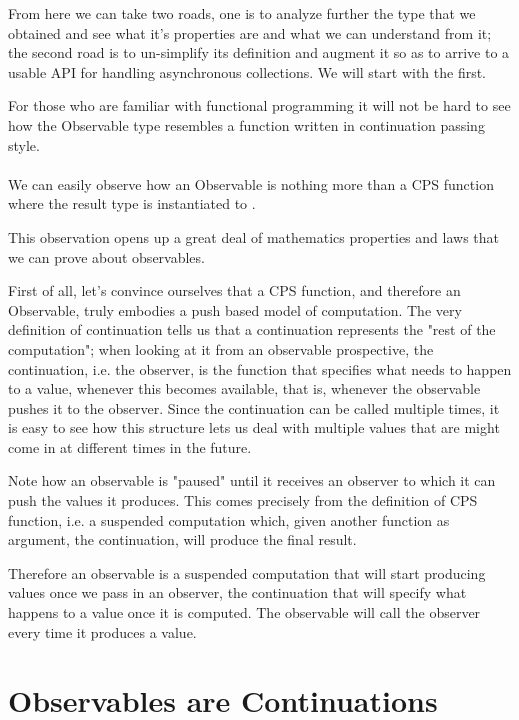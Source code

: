 From here we can take two roads, one is to analyze further the type that we obtained and see what it's properties are and what we can understand from it; the second road is to un-simplify its definition and augment it so as to arrive to a usable API for handling asynchronous collections. We will start with the first.

For those who are familiar with functional programming it will not be hard to see how the Observable type resembles a function written in continuation passing style.\\

\\

We can easily observe how an Observable is nothing more than a CPS function where the result type  is instantiated to .

This observation opens up a great deal of mathematics properties and laws that we can prove about observables.

First of all, let's convince ourselves that a CPS function, and therefore an Observable, truly embodies a push based model of computation. The very definition of continuation tells us that a continuation represents the "rest of the computation"; when looking at it from an observable prospective, the continuation, i.e. the observer, is the function that specifies what needs to happen to a value, whenever this becomes available, that is, whenever the observable pushes it to the observer. Since the continuation can be called multiple times, it is easy to see how this structure lets us deal with multiple values that are might come in at different times in the future.

Note how an observable is "paused" until it receives an observer to which it can push the values it produces. This comes precisely from the definition of CPS function, i.e. a suspended computation which, given another function as argument, the continuation, will produce the final result.  

Therefore an observable is a suspended computation that will start producing values once we pass in an observer, the continuation that will specify what happens to a value once it is computed. The observable will call the observer every time it produces a value.

\section{Observables are Continuations}
\label{sec:sec03}

